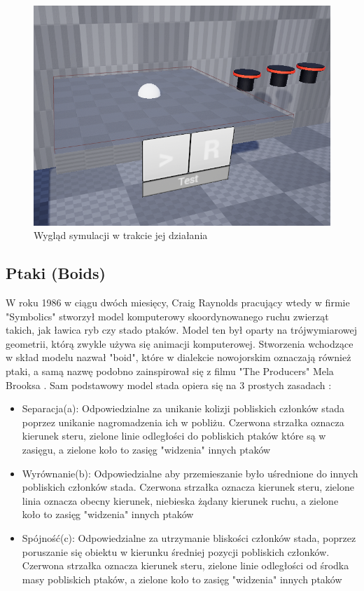 \documentclass[a4paper,12pt,reqno]{article}
\begin{document}
\begin{figure}[H]%
\centering
\includegraphics[width=0.5\columnwidth]{graphics/agent/AgentInUE_1.png}
\caption{Wygląd symulacji w trakcie jej działania
\label{BPExample}}%
%
\qquad
\end{figure}  



\newpage
\subsection{Ptaki (Boids)}

W roku 1986 w ciągu dwóch miesięcy, Craig Raynolds pracujący wtedy w firmie "Symbolics" stworzył model komputerowy skoordynowanego ruchu zwierząt takich, jak ławica ryb czy stado ptaków. Model ten był oparty na trójwymiarowej geometrii, którą zwykle używa się animacji komputerowej. Stworzenia wchodzące w skład modelu nazwał "boid", które w dialekcie nowojorskim oznaczają również ptaki, a samą nazwę podobno zainspirował się z filmu "The Producers" Mela Brooksa \cite{boids_name}. Sam podstawowy model stada opiera się na 3 prostych zasadach \cite{flocking_system}:

\begin{itemize}
\item Separacja(a): Odpowiedzialne za unikanie kolizji pobliskich członków stada poprzez unikanie nagromadzenia ich w pobliżu. Czerwona strzałka oznacza kierunek steru, zielone linie odległości do pobliskich ptaków które są w zasięgu, a zielone koło to zasięg "widzenia" innych ptaków
\item Wyrównanie(b): Odpowiedzialne aby przemieszanie było uśrednione do innych pobliskich członków stada. Czerwona strzałka oznacza kierunek steru, zielone linia oznacza obecny kierunek, niebieska żądany kierunek ruchu, a zielone koło to zasięg "widzenia" innych ptaków
\item Spójność(c): Odpowiedzialne za utrzymanie bliskości członków stada, poprzez poruszanie się obiektu w kierunku średniej pozycji pobliskich członków. Czerwona strzałka oznacza kierunek steru, zielone linie odległości od środka masy pobliskich ptaków, a zielone koło to zasięg "widzenia" innych ptaków
\end{itemize}
\end{document}
